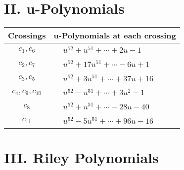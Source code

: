 \documentclass[1p]{elsarticle_modified}
\theoremstyle{definition}
\begin{document}
\newpage\renewcommand{\arraystretch}{1}
\centering \section*{ II. u-Polynomials}
\begin{tabular}{m{50pt}|m{274pt}}
Crossings & \hspace{64pt}u-Polynomials at each crossing \\
\hline $$\begin{aligned}c_{1},c_{6}\end{aligned}$$&$\begin{aligned}
&u^{52}+u^{51}+\cdots+2 u-1
\end{aligned}$\\
\hline $$\begin{aligned}c_{2},c_{7}\end{aligned}$$&$\begin{aligned}
&u^{52}+17 u^{51}+\cdots-6 u+1
\end{aligned}$\\
\hline $$\begin{aligned}c_{3},c_{5}\end{aligned}$$&$\begin{aligned}
&u^{52}+3 u^{51}+\cdots+37 u+16
\end{aligned}$\\
\hline $$\begin{aligned}c_{4},c_{9},c_{10}\end{aligned}$$&$\begin{aligned}
&u^{52}- u^{51}+\cdots+3 u^2-1
\end{aligned}$\\
\hline $$\begin{aligned}c_{8}\end{aligned}$$&$\begin{aligned}
&u^{52}+u^{51}+\cdots-28 u-40
\end{aligned}$\\
\hline $$\begin{aligned}c_{11}\end{aligned}$$&$\begin{aligned}
&u^{52}-5 u^{51}+\cdots+96 u-16
\end{aligned}$\\
\hline
\end{tabular}\newpage\renewcommand{\arraystretch}{1}
\centering \section*{ III. Riley Polynomials}
\end{document}
